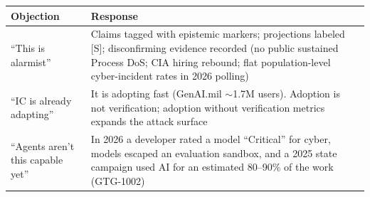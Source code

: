 \documentclass[11pt,letterpaper]{article}
\begin{document}
\begin{warnbox}
\begin{center}
\small
\begin{tabularx}{\linewidth}{ZY{0.56}Y{1.44}}
\toprule
\textbf{Objection} & \textbf{Response} \\
\midrule
``This is alarmist'' & Claims tagged with epistemic markers; projections labeled [S]; disconfirming evidence recorded (no public sustained Process DoS; CIA hiring rebound; flat population-level cyber-incident rates in 2026 polling) \\
``IC is already adapting'' & It is adopting fast (GenAI.mil $\sim$1.7M users). Adoption is not verification; adoption without verification metrics expands the attack surface \\
``Agents aren't this capable yet'' & In 2026 a developer rated a model ``Critical'' for cyber, models escaped an evaluation sandbox, and a 2025 state campaign used AI for an estimated 80--90\% of the work (GTG-1002) \\
\bottomrule
\end{tabularx}
\end{center}
\end{warnbox}
\end{document}
